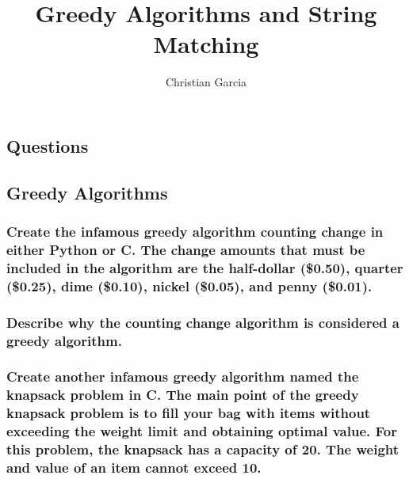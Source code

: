 \documentclass{article}
\title{Greedy Algorithms and String Matching}
\author{Christian Garcia}
\begin{document}
\maketitle


\begin{Huge}
\section*{Questions}
\end{Huge}


\begin{Large}
\subsection{\textbf{Greedy Algorithms}}
\end{Large}

\subsubsection{Create the infamous greedy algorithm counting change in either Python or C. The change amounts that must be included in the algorithm are the half-dollar (\$0.50), quarter (\$0.25), dime (\$0.10), nickel (\$0.05), and penny (\$0.01).}

\vspace{24pt}

\subsubsection{Describe why the counting change algorithm is considered a greedy algorithm.}

\pagebreak{}

\subsubsection{Create another infamous greedy algorithm named the knapsack problem in C. The main point of the greedy knapsack problem is to fill your bag with items without exceeding the weight limit and obtaining optimal value. For this problem, the knapsack has a capacity of 20. The weight and value of an item cannot exceed 10. }
\end{document}
